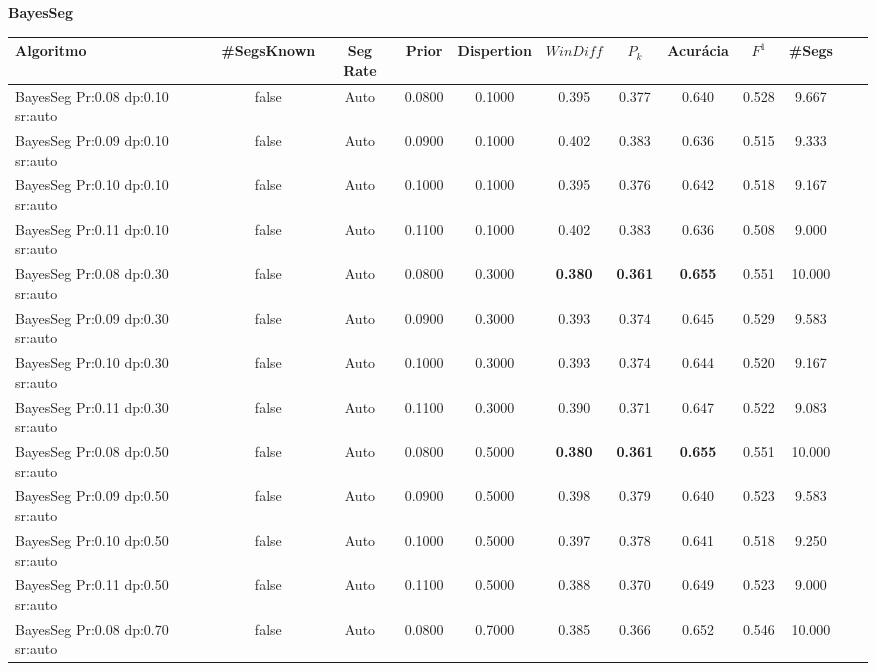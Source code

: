 \documentclass{article}
\begin{document}
{  
\large
\center
	\textbf{BayesSeg}  

}

\begin{longtable}[c]{|l|c|c|c|c|c|c|c|c|c|c|c|} 
\hline 
Algoritmo & \#SegsKnown & Seg Rate & Prior & Dispertion & $WinDiff$ & $P_k$ & Acurácia & $F^1$ & \#Segs\\ \hline 
BayesSeg Pr:0.08 dp:0.10 sr:auto & false & Auto & 0.0800 & 0.1000 & 0.395 & 0.377 & 0.640 & 0.528 & 9.667  \\ \hline 
 BayesSeg Pr:0.09 dp:0.10 sr:auto & false & Auto & 0.0900 & 0.1000 & 0.402 & 0.383 & 0.636 & 0.515 & 9.333  \\ \hline 
 BayesSeg Pr:0.10 dp:0.10 sr:auto & false & Auto & 0.1000 & 0.1000 & 0.395 & 0.376 & 0.642 & 0.518 & 9.167  \\ \hline 
 BayesSeg Pr:0.11 dp:0.10 sr:auto & false & Auto & 0.1100 & 0.1000 & 0.402 & 0.383 & 0.636 & 0.508 & 9.000  \\ \hline 
 BayesSeg Pr:0.08 dp:0.30 sr:auto & false & Auto & 0.0800 & 0.3000 & \cellcolor{gray!20} \textbf{0.380} & \cellcolor{gray!20} \textbf{0.361} & \cellcolor{gray!20} \textbf{0.655} & 0.551 & 10.000  \\ \hline 
 BayesSeg Pr:0.09 dp:0.30 sr:auto & false & Auto & 0.0900 & 0.3000 & 0.393 & 0.374 & 0.645 & 0.529 & 9.583  \\ \hline 
 BayesSeg Pr:0.10 dp:0.30 sr:auto & false & Auto & 0.1000 & 0.3000 & 0.393 & 0.374 & 0.644 & 0.520 & 9.167  \\ \hline 
 BayesSeg Pr:0.11 dp:0.30 sr:auto & false & Auto & 0.1100 & 0.3000 & 0.390 & 0.371 & 0.647 & 0.522 & 9.083  \\ \hline 
 BayesSeg Pr:0.08 dp:0.50 sr:auto & false & Auto & 0.0800 & 0.5000 & \cellcolor{gray!20} \textbf{0.380} & \cellcolor{gray!20} \textbf{0.361} & \cellcolor{gray!20} \textbf{0.655} & 0.551 & 10.000  \\ \hline 
 BayesSeg Pr:0.09 dp:0.50 sr:auto & false & Auto & 0.0900 & 0.5000 & 0.398 & 0.379 & 0.640 & 0.523 & 9.583  \\ \hline 
 BayesSeg Pr:0.10 dp:0.50 sr:auto & false & Auto & 0.1000 & 0.5000 & 0.397 & 0.378 & 0.641 & 0.518 & 9.250  \\ \hline 
 BayesSeg Pr:0.11 dp:0.50 sr:auto & false & Auto & 0.1100 & 0.5000 & 0.388 & 0.370 & 0.649 & 0.523 & 9.000  \\ \hline 
 BayesSeg Pr:0.08 dp:0.70 sr:auto & false & Auto & 0.0800 & 0.7000 & 0.385 & 0.366 & 0.652 & 0.546 & 10.000  \\ \hline 

\end{longtable}
\end{document}
